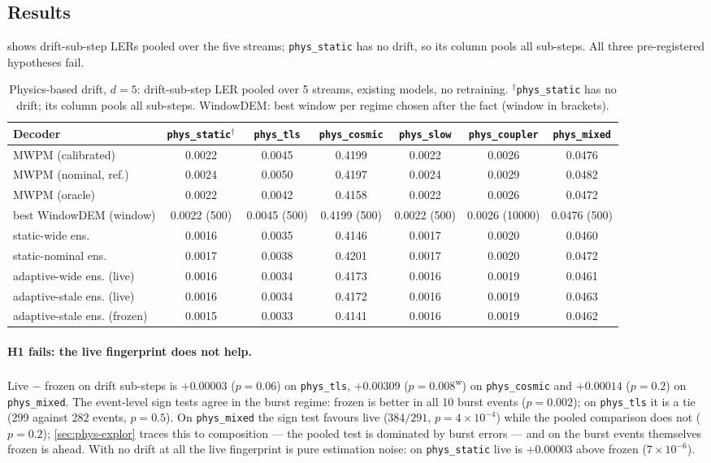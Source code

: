 \documentclass[11pt,a4paper]{article}
\newcommand{\reg}[1]{\texttt{#1}}
\newcommand{\E}[2]{${#1}{\times}10^{-#2}$}  %
\newcommand{\Eb}[2]{{#1}{\times}10^{-#2}}   %
\newcommand{\weak}{\textsuperscript{w}}     %
\begin{document}
\subsection{Results}\label{sec:phys-results}
 shows drift-sub-step LERs pooled over the five streams; \reg{phys\_static} has no drift, so
its column pools all sub-steps. All three pre-registered hypotheses fail.

\begin{table}[t]
\centering
\footnotesize
\setlength{\tabcolsep}{4pt}
\begin{tabular}{@{}lcccccc@{}}
\toprule
Decoder & \reg{phys\_static}$^{\dagger}$ & \reg{phys\_tls} & \reg{phys\_cosmic} & \reg{phys\_slow} & \reg{phys\_coupler} & \reg{phys\_mixed} \\
\midrule
MWPM (calibrated) & 0.0022 & 0.0045 & 0.4199 & 0.0022 & 0.0026 & 0.0476 \\
MWPM (nominal, ref.) & 0.0024 & 0.0050 & 0.4197 & 0.0024 & 0.0029 & 0.0482 \\
MWPM (oracle) & 0.0022 & 0.0042 & 0.4158 & 0.0022 & 0.0026 & 0.0472 \\
best WindowDEM (window) & 0.0022 (500) & 0.0045 (500) & 0.4199 (500) & 0.0022 (500) & 0.0026 (10000) & 0.0476 (500) \\
static-wide ens. & 0.0016 & 0.0035 & 0.4146 & 0.0017 & 0.0020 & 0.0460 \\
static-nominal ens. & 0.0017 & 0.0038 & 0.4201 & 0.0017 & 0.0020 & 0.0472 \\
adaptive-wide ens. (live) & 0.0016 & 0.0034 & 0.4173 & 0.0016 & 0.0019 & 0.0461 \\
adaptive-stale ens. (live) & 0.0016 & 0.0034 & 0.4172 & 0.0016 & 0.0019 & 0.0463 \\
adaptive-stale ens. (frozen) & 0.0015 & 0.0033 & 0.4141 & 0.0016 & 0.0019 & 0.0462 \\
\bottomrule
\end{tabular}
\caption{Physics-based drift, $d=5$: drift-sub-step LER pooled over 5 streams, existing models, no
retraining. $^{\dagger}$\reg{phys\_static} has no drift; its column pools all sub-steps. WindowDEM: best
window per regime chosen after the fact (window in brackets).}
\label{tab:phys}
\end{table}

\paragraph{H1 fails: the live fingerprint does not help.}
Live $-$ frozen on drift sub-steps is $+0.00003$ ($p=0.06$) on \reg{phys\_tls}, $+0.00309$
($p=0.008$\weak) on \reg{phys\_cosmic} and $+0.00014$ ($p=0.2$) on \reg{phys\_mixed}. The event-level sign
tests agree in the burst regime: frozen is better in all 10 burst events ($p=0.002$); on \reg{phys\_tls}
it is a tie (299 against 282 events, $p=0.5$). On \reg{phys\_mixed} the sign test favours live ($384/291$,
$p=\Eb{4}{4}$) while the pooled comparison does not ($p=0.2$); \cref{sec:phys-explor} traces this to
composition --- the pooled test is dominated by burst errors --- and on the burst events themselves frozen
is ahead. With no drift at all the live fingerprint is pure estimation noise: on \reg{phys\_static} live is
$+0.00003$ above frozen (\E{7}{6}).
\end{document}
